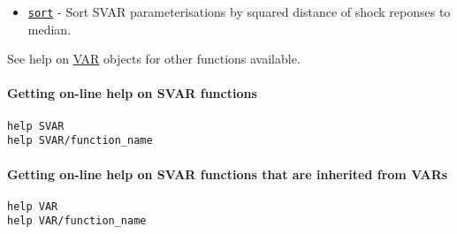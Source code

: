 \begin{itemize}
\itemsep1pt\parskip0pt
\item
  \href{SVAR/sort}{\texttt{sort}} - Sort SVAR parameterisations by
  squared distance of shock reponses to median.
\end{itemize}

See help on \href{VAR/Contents}{VAR} objects for other functions
available.

\paragraph{Getting on-line help on SVAR
functions}

\begin{verbatim}
help SVAR
help SVAR/function_name
\end{verbatim}

\paragraph{Getting on-line help on SVAR functions that are inherited
from
VARs}

\begin{verbatim}
help VAR
help VAR/function_name
\end{verbatim}



